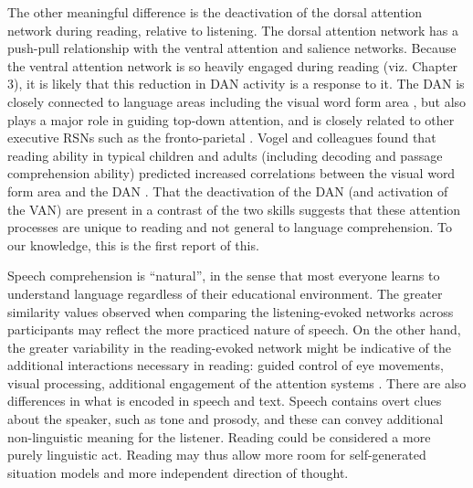 The other meaningful difference is the deactivation of the dorsal attention network during reading, relative to listening. The dorsal attention network has a push-pull relationship with the ventral attention and salience networks. Because the ventral attention network is so heavily engaged during reading (viz. Chapter 3), it is likely that this reduction in DAN activity is a response to it. The DAN is closely connected to language areas including the visual word form area \citep{Bouhali2014}, but also plays a major role in guiding top-down attention, and is closely related to other executive RSNs such as the fronto-parietal \citep{Vogel2014}. Vogel and colleagues found that reading ability in typical children and adults (including decoding and passage comprehension ability) predicted increased correlations between the visual word form area and the DAN \citep{Vogel2012a}. That the deactivation of the DAN (and activation of the VAN) are present in a contrast of the two skills suggests that these attention processes are unique to reading and not general to language comprehension. To our knowledge, this is the first report of this.


Speech comprehension is ``natural'', in the sense that most everyone learns to understand language regardless of their educational environment. The greater similarity values observed when comparing the listening-evoked networks across participants may reflect the more practiced nature of speech. On the other hand, the greater variability in the reading-evoked network might be indicative of the additional interactions necessary in reading: guided control of eye movements, visual processing, additional engagement of the attention systems \citep{Mattingly1971, Rayner2006}. There are also differences in what is encoded in speech and text.  Speech contains overt clues about the speaker, such as tone and prosody, and these can convey additional non-linguistic meaning for the listener. Reading could be considered a more purely linguistic act. Reading may thus allow more room for self-generated situation models and more independent direction of thought. 

